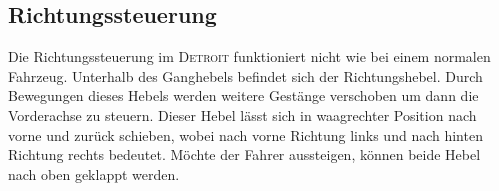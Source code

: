 \subsection{Richtungssteuerung}

Die Richtungssteuerung im \textsc{Detroit} funktioniert nicht wie bei einem normalen Fahrzeug. Unterhalb des Ganghebels befindet sich der Richtungshebel. Durch Bewegungen dieses Hebels werden weitere Gestänge verschoben um dann die Vorderachse zu steuern. Dieser Hebel lässt sich in waagrechter Position nach vorne und zurück schieben, wobei nach vorne Richtung links und nach hinten Richtung rechts bedeutet. Möchte der Fahrer aussteigen, können beide Hebel nach oben geklappt werden.


\newpage
